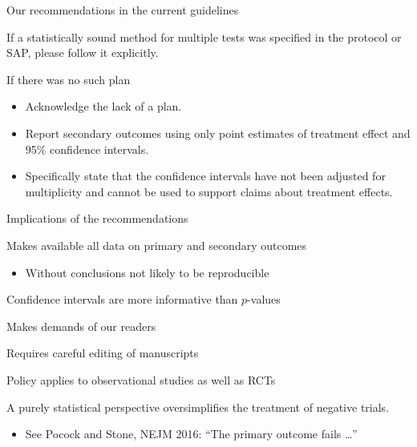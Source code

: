 \documentclass[ignorenonframetext,]{beamer}
\providecommand{\tightlist}{%
  \setlength{\itemsep}{0pt}\setlength{\parskip}{0pt}}
\begin{document}
\begin{frame}{Our recommendations in the current guidelines}
\protect\hypertarget{our-recommendations-in-the-current-guidelines}{}

If a statistically sound method for multiple tests was specified in the
protocol or SAP, please follow it explicitly.

If there was no such plan

\begin{itemize}
\item
  Acknowledge the lack of a plan.
\item
  Report secondary outcomes using only point estimates of treatment
  effect and 95\% confidence intervals.
\item
  Specifically state that the confidence intervals have not been
  adjusted for multiplicity and cannot be used to support claims about
  treatment effects.
\end{itemize}

\end{frame}

\begin{frame}{Implications of the recommendations}
\protect\hypertarget{implications-of-the-recommendations}{}

Makes available all data on primary and secondary outcomes

\begin{itemize}
\tightlist
\item
  Without conclusions not likely to be reproducible
\end{itemize}

Confidence intervals are more informative than \(p\)-values

Makes demands of our readers

Requires careful editing of manuscripts

Policy applies to observational studies as well as RCTs

A purely statistical perspective oversimplifies the treatment of
negative trials.

\begin{itemize}
\tightlist
\item
  See Pocock and Stone, NEJM 2016: ``The primary outcome fails \ldots''
\end{itemize}

\end{frame}
\end{document}
